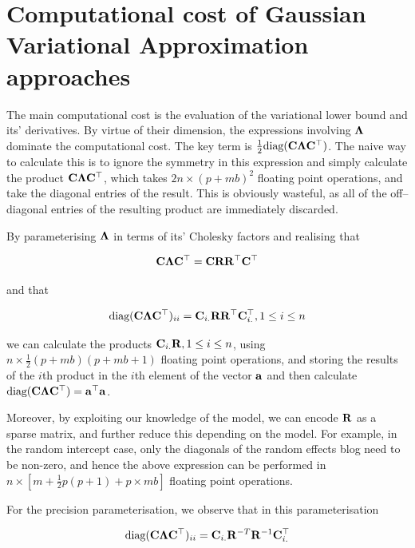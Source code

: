 \documentclass[times, doublespace]{anzsauth}
\begin{document}
		
	\section{Computational cost of Gaussian Variational Approximation approaches}
	
	The main computational cost is the evaluation of the variational lower bound and its' derivatives. By virtue
	of their dimension, the expressions involving ${\boldsymbol \Lambda}$ dominate the computational cost. The key term is
	$\frac{1}{2} \text{diag}({\bf C} {\boldsymbol \Lambda} {\bf C}^\top)$. The naive way to calculate this is to ignore the symmetry in
	this expression and simply calculate the product ${\bf C} {\boldsymbol \Lambda} {\bf C}^\top$, which takes $2 n \times (p + m
	b)^2$ floating point operations, and take the diagonal entries of the result. This is obviously wasteful, as
	all of the off--diagonal entries of the resulting product are immediately discarded.
	
	\noindent By parameterising ${\boldsymbol \Lambda}$ in terms of its' Cholesky factors and realising that
	
	\[
		{\bf C} {\boldsymbol \Lambda} {\bf C}^\top = {\bf C} {\bf R} {\bf R}^\top {\bf C}^\top
	\]
	
	\noindent and that
	
	\[
		\text{diag}({\bf C} {\boldsymbol \Lambda} {\bf C}^\top)_{ii} = {\bf C}_{i .} {\bf R} {\bf R}^\top {\bf C}_{i .}^\top, 1 \leq i \leq n
	\]
	
	\noindent we can calculate the products ${\bf C}_{i .} {\bf R}, 1 \leq i \leq n$, using $n \times \frac{1}{2}(p + m
	b)(p + m b   + 1)$ floating point operations, and storing the results of the $i$th product in the $i$th
	element of the   vector ${\bf a}$ and then calculate $\text{diag}({\bf C} {\boldsymbol \Lambda} {\bf C}^\top) = {\bf a}^\top {\bf a}$.
	
	\noindent Moreover, by exploiting our knowledge of the model, we can encode ${\bf R}$ as a sparse matrix, and
	further reduce   this depending on the model. For example, in the random intercept case, only the diagonals of
	the random   effects blog need to be non-zero, and hence the above expression can be performed in   $n \times
	[m + \frac{1}{2} p (p + 1) + p \times m b]$ floating point operations.
	
	
	\noindent For the precision parameterisation, we observe that in this parameterisation
	
	\[
		\text{diag}({\bf C} {\boldsymbol \Lambda} {\bf C}^\top)_{ii} = {\bf C}_{i .} {\bf R}^{-T} {\bf R}^{-1} {\bf C}_{i .}^\top
	\]
	
\end{document}
